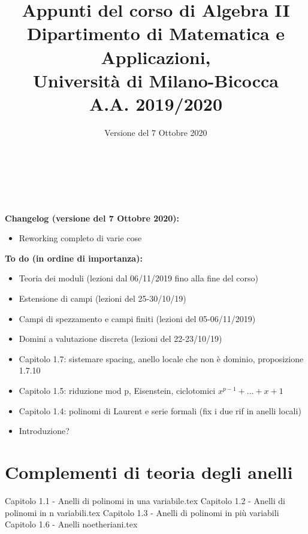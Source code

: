 \documentclass{article}
\begin{document}
\AddToShipoutPicture*{\BackgroundPic}

\title{\Huge{\textbf{Appunti del corso di Algebra II}} \\ \vspace{3mm}
	   \LARGE{\textbf{Dipartimento di Matematica e Applicazioni,}} \\ 
	   \LARGE{\textbf{Università di Milano-Bicocca}} \\ \vspace{3mm}
	   \Large{\textbf{A.A. 2019/2020}} %
	   }
\author{Versione del 7 Ottobre 2020}
\date{}

\maketitle
\thispagestyle{empty}
\clearpage

\tableofcontents

\

\

\noindent \textbf{Changelog (versione del 7 Ottobre 2020):}
\begin{itemize}
\item Reworking completo di varie cose
\end{itemize}

\noindent \textbf{To do (in ordine di importanza):}
\begin{itemize}
\item Teoria dei moduli (lezioni dal 06/11/2019 fino alla fine del corso)
\item Estensione di campi (lezioni del 25-30/10/19)
\item Campi di spezzamento e campi finiti (lezioni del 05-06/11/2019)
\item Domini a valutazione discreta (lezioni del 22-23/10/19)
\item Capitolo 1.7: sistemare spacing, anello locale che non è dominio, proposizione 1.7.10
\item Capitolo 1.5: riduzione mod p, Eisenstein, ciclotomici $x^{p-1}+...+x+1$
\item Capitolo 1.4: polinomi di Laurent e serie formali (fix i due rif in anelli locali)
\item Introduzione?
\end{itemize}
\clearpage

\section{Complementi di teoria degli anelli}
{Capitolo 1.1 - Anelli di polinomi in una variabile.tex}
{Capitolo 1.2 - Anelli di polinomi in n variabili.tex}
{Capitolo 1.3 - Anelli di polinomi in più variabili}
{Capitolo 1.6 - Anelli noetheriani.tex}
\end{document}
